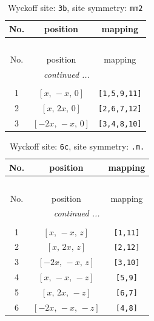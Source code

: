 \documentclass[fleqn,8pt]{jsarticle}
\begin{document}
\begin{longtable}{ccc}
\caption{Wyckoff site: {\tt 3b}, site symmetry: {\tt mm2}}
 \\
 \hline \hline
No. & position & mapping \\ \hline \endfirsthead

\multicolumn{2}{l}{\tablename\ \thetable{}} \\
 \hline \hline
No. & position & mapping \\ \hline \endhead

 \hline \hline
\multicolumn{2}{r}{\footnotesize\it continued ...} \\ \endfoot

 \hline \hline
\multicolumn{2}{r}{} \\ \endlastfoot

1 & $\left[ x,\, - x,\, 0 \right]$ & {\tt [1,5,9,11]} \\ \hline
2 & $\left[ x,\, 2 x,\, 0 \right]$ & {\tt [2,6,7,12]} \\ \hline
3 & $\left[ - 2 x,\, - x,\, 0 \right]$ & {\tt [3,4,8,10]} \\
\end{longtable}
\renewcommand{\arraystretch}{1.2}
\begin{longtable}{ccc}
\caption{Wyckoff site: {\tt 6c}, site symmetry: {\tt .m.}}
 \\
 \hline \hline
No. & position & mapping \\ \hline \endfirsthead

\multicolumn{2}{l}{\tablename\ \thetable{}} \\
 \hline \hline
No. & position & mapping \\ \hline \endhead

 \hline \hline
\multicolumn{2}{r}{\footnotesize\it continued ...} \\ \endfoot

 \hline \hline
\multicolumn{2}{r}{} \\ \endlastfoot

1 & $\left[ x,\, - x,\, z \right]$ & {\tt [1,11]} \\ \hline
2 & $\left[ x,\, 2 x,\, z \right]$ & {\tt [2,12]} \\ \hline
3 & $\left[ - 2 x,\, - x,\, z \right]$ & {\tt [3,10]} \\ \hline
4 & $\left[ x,\, - x,\, - z \right]$ & {\tt [5,9]} \\ \hline
5 & $\left[ x,\, 2 x,\, - z \right]$ & {\tt [6,7]} \\ \hline
6 & $\left[ - 2 x,\, - x,\, - z \right]$ & {\tt [4,8]} \\
\end{longtable}
\end{document}
